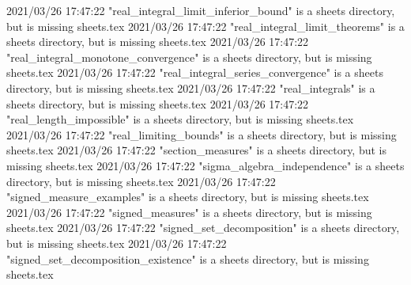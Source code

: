 2021/03/26 17:47:22 "real_integral_limit_inferior_bound" is a sheets directory, but is missing sheets.tex
2021/03/26 17:47:22 "real_integral_limit_theorems" is a sheets directory, but is missing sheets.tex
2021/03/26 17:47:22 "real_integral_monotone_convergence" is a sheets directory, but is missing sheets.tex
2021/03/26 17:47:22 "real_integral_series_convergence" is a sheets directory, but is missing sheets.tex
2021/03/26 17:47:22 "real_integrals" is a sheets directory, but is missing sheets.tex
2021/03/26 17:47:22 "real_length_impossible" is a sheets directory, but is missing sheets.tex
2021/03/26 17:47:22 "real_limiting_bounds" is a sheets directory, but is missing sheets.tex
2021/03/26 17:47:22 "section_measures" is a sheets directory, but is missing sheets.tex
2021/03/26 17:47:22 "sigma_algebra_independence" is a sheets directory, but is missing sheets.tex
2021/03/26 17:47:22 "signed_measure_examples" is a sheets directory, but is missing sheets.tex
2021/03/26 17:47:22 "signed_measures" is a sheets directory, but is missing sheets.tex
2021/03/26 17:47:22 "signed_set_decomposition" is a sheets directory, but is missing sheets.tex
2021/03/26 17:47:22 "signed_set_decomposition_existence" is a sheets directory, but is missing sheets.tex
